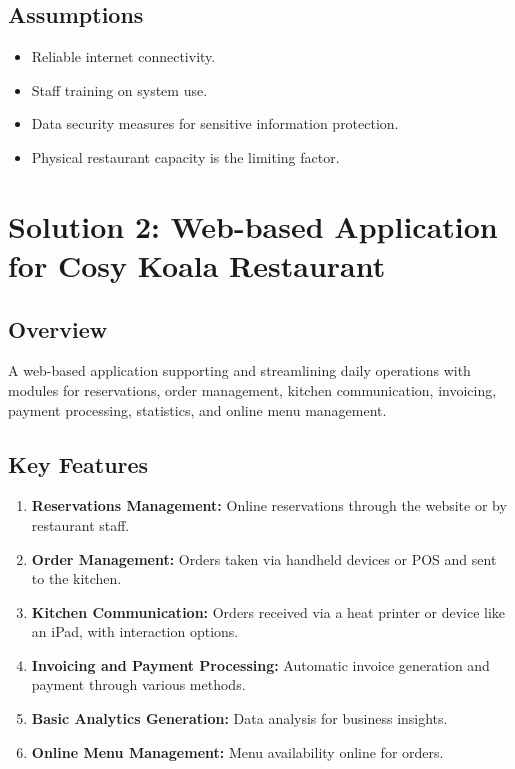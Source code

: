 \documentclass{article}
\begin{document}
\subsection*{Assumptions}
\begin{itemize}
    \item Reliable internet connectivity.
    \item Staff training on system use.
    \item Data security measures for sensitive information protection.
    \item Physical restaurant capacity is the limiting factor.
\end{itemize}

\section*{Solution 2: Web-based Application for Cosy Koala Restaurant}

\subsection*{Overview}
A web-based application supporting and streamlining daily operations with modules for reservations, order management, kitchen communication, invoicing, payment processing, statistics, and online menu management.

\subsection*{Key Features}
\begin{enumerate}[label=\alph*.]
    \item \textbf{Reservations Management:} Online reservations through the website or by restaurant staff.
    \item \textbf{Order Management:} Orders taken via handheld devices or POS and sent to the kitchen.
    \item \textbf{Kitchen Communication:} Orders received via a heat printer or device like an iPad, with interaction options.
    \item \textbf{Invoicing and Payment Processing:} Automatic invoice generation and payment through various methods.
    \item \textbf{Basic Analytics Generation:} Data analysis for business insights.
    \item \textbf{Online Menu Management:} Menu availability online for orders.
\end{enumerate}
\end{document}
